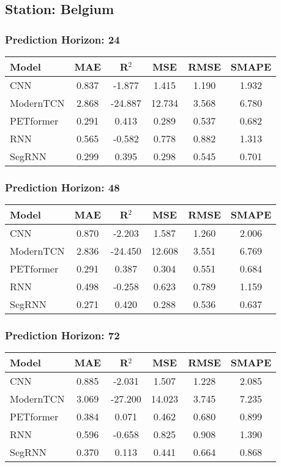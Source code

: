 \subsection*{Station: Belgium}
\subsubsection*{Prediction Horizon: 24}
\begin{tabular}{lccccc}
\toprule
Model & MAE & R$^2$ & MSE & RMSE & SMAPE \\
\midrule
CNN & 0.837 & -1.877 & 1.415 & 1.190 & 1.932 \\
ModernTCN & 2.868 & -24.887 & 12.734 & 3.568 & 6.780 \\
PETformer & 0.291 & 0.413 & 0.289 & 0.537 & 0.682 \\
RNN & 0.565 & -0.582 & 0.778 & 0.882 & 1.313 \\
SegRNN & 0.299 & 0.395 & 0.298 & 0.545 & 0.701 \\
\bottomrule
\end{tabular}
\vspace{0.5cm}
\subsubsection*{Prediction Horizon: 48}
\begin{tabular}{lccccc}
\toprule
Model & MAE & R$^2$ & MSE & RMSE & SMAPE \\
\midrule
CNN & 0.870 & -2.203 & 1.587 & 1.260 & 2.006 \\
ModernTCN & 2.836 & -24.450 & 12.608 & 3.551 & 6.769 \\
PETformer & 0.291 & 0.387 & 0.304 & 0.551 & 0.684 \\
RNN & 0.498 & -0.258 & 0.623 & 0.789 & 1.159 \\
SegRNN & 0.271 & 0.420 & 0.288 & 0.536 & 0.637 \\
\bottomrule
\end{tabular}
\vspace{0.5cm}
\subsubsection*{Prediction Horizon: 72}
\begin{tabular}{lccccc}
\toprule
Model & MAE & R$^2$ & MSE & RMSE & SMAPE \\
\midrule
CNN & 0.885 & -2.031 & 1.507 & 1.228 & 2.085 \\
ModernTCN & 3.069 & -27.200 & 14.023 & 3.745 & 7.235 \\
PETformer & 0.384 & 0.071 & 0.462 & 0.680 & 0.899 \\
RNN & 0.596 & -0.658 & 0.825 & 0.908 & 1.390 \\
SegRNN & 0.370 & 0.113 & 0.441 & 0.664 & 0.868 \\
\bottomrule
\end{tabular}
\vspace{0.5cm}
